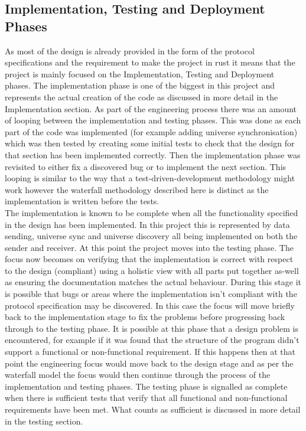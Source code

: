 \documentclass[11pt,a4paper]{report}
\begin{document}
\subsection{Implementation, Testing and Deployment Phases}
As most of the design is already provided in the form of the protocol specifications and the requirement to make the project in rust it means that the project is mainly focused on the Implementation, Testing and Deployment phases. The implementation phase is one of the biggest in this project and represents the actual creation of the code as discussed in more detail in the Implementation section. As part of the engineering process there was an amount of looping between the implementation and testing phases. This was done as each part of the code was implemented (for example adding universe synchronisation) which was then tested by creating some initial tests to check that the design for that section has been implemented correctly. Then the implementation phase was revisited to either fix a discovered bug or to implement the next section. This looping is similar to the way that a test-driven-development methodology might work however the waterfall methodology described here is distinct as the implementation is written before the tests.\\

The implementation is known to be complete when all the functionality specified in the design has been implemented. In this project this is represented by data sending, universe sync and universe discovery all being implemented on both the sender and receiver. At this point the project moves into the testing phase. The focus now becomes on verifying that the implementation is correct with respect to the design (compliant) using a holistic view with all parts put together as-well as ensuring the documentation matches the actual behaviour. During this stage it is possible that bugs or areas where the implementation isn't compliant with the protocol specification may be discovered. In this case the focus will move briefly back to the implementation stage to fix the problems before progressing back through to the testing phase. It is possible at this phase that a design problem is encountered, for example if it was found that the structure of the program didn't support a functional or non-functional requirement. If this happens then at that point the engineering focus would move back to the design stage and as per the waterfall model the focus would then continue through the process of the implementation and testing phases. The testing phase is signalled as complete when there is sufficient tests that verify that all functional and non-functional requirements have been met. What counts as sufficient is discussed in more detail in the testing section.\\
\end{document}
